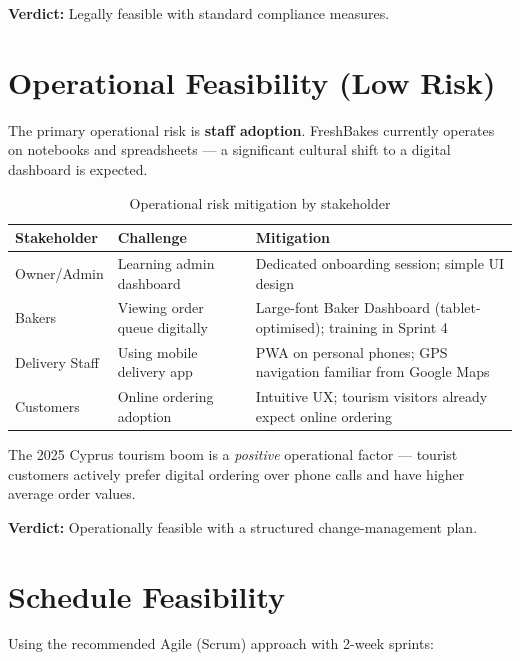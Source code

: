 \documentclass[12pt, a4paper]{report}
\begin{document}
\begin{verdictbox}
\textbf{Verdict:} Legally feasible with standard compliance measures.
\end{verdictbox}

\section{Operational Feasibility (Low Risk)}

The primary operational risk is \textbf{staff adoption}. FreshBakes currently
operates on notebooks and spreadsheets --- a significant cultural shift to a
digital dashboard is expected.

\begin{table}[H]
  \centering
  \begin{tabularx}{\textwidth}{L{3cm} L{4.5cm} X}
    \toprule
    \textbf{Stakeholder} & \textbf{Challenge} & \textbf{Mitigation} \\
    \midrule
    Owner/Admin      & Learning admin dashboard          & Dedicated onboarding session; simple UI design \\
    Bakers           & Viewing order queue digitally     & Large-font Baker Dashboard (tablet-optimised); training in Sprint 4 \\
    Delivery Staff   & Using mobile delivery app         & PWA on personal phones; GPS navigation familiar from Google Maps \\
    Customers        & Online ordering adoption          & Intuitive UX; tourism visitors already expect online ordering \\
    \bottomrule
  \end{tabularx}
  \caption{Operational risk mitigation by stakeholder}
\end{table}

The 2025 Cyprus tourism boom is a \textit{positive} operational factor ---
tourist customers actively prefer digital ordering over phone calls and have
higher average order values.

\begin{verdictbox}
\textbf{Verdict:} Operationally feasible with a structured change-management
plan.
\end{verdictbox}

\section{Schedule Feasibility}

Using the recommended Agile (Scrum) approach with 2-week sprints:
\end{document}
